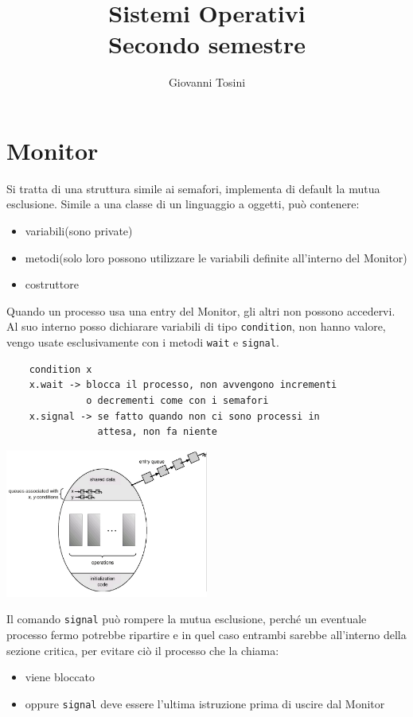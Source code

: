 \documentclass[a4paper, 12pt]{book}
\begin{document}
    
\author{Giovanni Tosini}
\title{Sistemi Operativi \\
\large Secondo semestre}
\date{ }
\maketitle
\newpage
\tableofcontents
\newpage

\chapter{Monitor}

Si tratta di una struttura simile ai semafori, implementa di default la mutua esclusione. Simile a una classe di un linguaggio a oggetti, può contenere:
\begin{itemize}
    \item variabili(sono private)
    \item metodi(solo loro possono utilizzare le variabili definite all'interno del Monitor)
    \item costruttore
\end{itemize}

Quando un processo usa una entry del Monitor, gli altri non possono accedervi. Al suo interno posso dichiarare variabili di tipo \verb|condition|, non hanno valore, vengo usate esclusivamente con i metodi \verb|wait| e \verb|signal|.

\begin{verbatim}
    condition x
    x.wait -> blocca il processo, non avvengono incrementi
              o decrementi come con i semafori
    x.signal -> se fatto quando non ci sono processi in
                attesa, non fa niente
\end{verbatim}

\begin{center}
    \includegraphics[width=0.5\textwidth]{ovetto.png}
\end{center}

Il comando \verb|signal| può rompere la mutua esclusione, perché un eventuale processo fermo potrebbe ripartire e in quel caso entrambi sarebbe all'interno della sezione critica, per evitare ciò il processo che la chiama:
\begin{itemize}
    \item viene bloccato
    \item oppure \verb|signal| deve essere l'ultima istruzione prima di uscire dal Monitor
\end{itemize}
\end{document}

